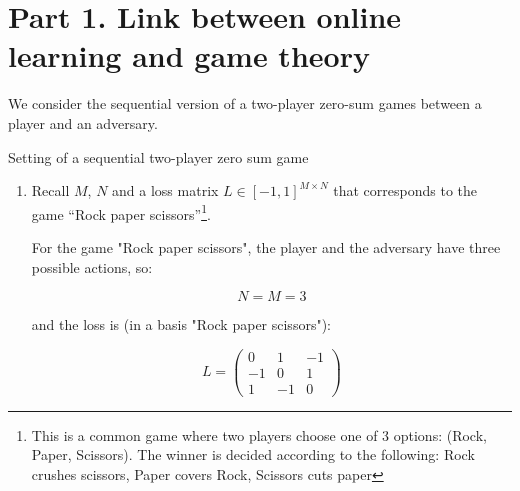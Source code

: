 \section*{Part 1. Link between online learning and game theory}

We consider the sequential version of a two-player zero-sum games between a player and an adversary. 
\begin{setting}[ht!]
\begin{center}
\end{center}

\caption{Setting of a sequential two-player zero sum game}
\label{fig:setting}
\end{setting}

\begin{enumerate}
	\item Recall $M$, $N$ and a loss matrix $L \in [-1,1]^{M\times N}$ that corresponds to the game ``Rock paper scissors''\footnote{This is a common game where two players choose one of 3 options: (Rock, Paper, Scissors). The winner is decided according to the following: Rock crushes scissors, Paper covers Rock, Scissors cuts paper}.
	
    \begin{solution}
For the game "Rock paper scissors", the player and the adversary have three possible actions, so:

\begin{equation*}
        \boxed{N=M=3}
\end{equation*}

and the loss is (in a basis "Rock paper scissors"):

\begin{equation*}
            \boxed{L = \begin{pmatrix}
       0 & 1 & -1 \\
       -1 & 0 & 1 \\
       1 & -1 & 0
    \end{pmatrix}}
        \end{equation*}
    \end{solution}
\end{enumerate}

